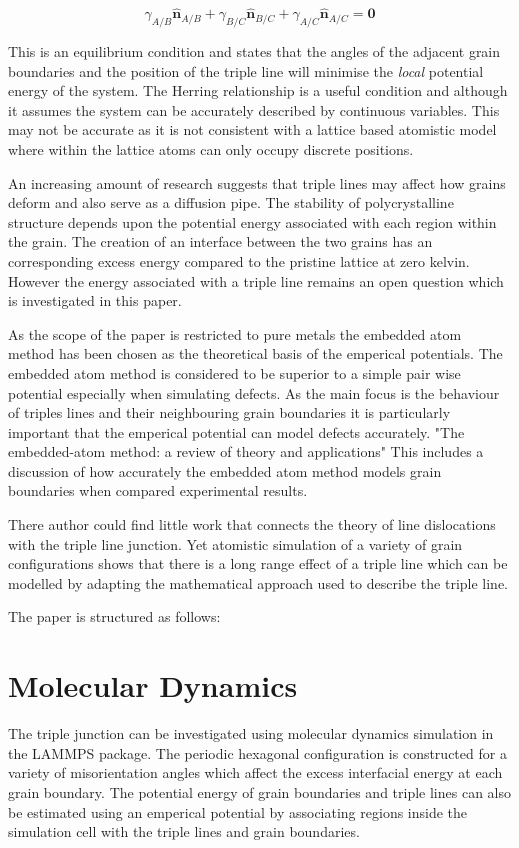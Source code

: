 \documentclass[12pt,a4paper]{book}
\begin{document}
\[\gamma_{A/B}\mathbf{\hat{n}}_{A/B} + \gamma_{B/C}\mathbf{\hat{n}}_{B/C} + \gamma_{A/C}\mathbf{\hat{n}}_{A/C} =\mathbf{0} \]

This is an equilibrium condition and states that the angles of the adjacent grain boundaries and the position of the triple line will minimise the \emph{local} potential energy of the system. The Herring relationship is a useful condition and although it assumes the system can be accurately described by continuous variables. This may not be accurate as it is not consistent with a lattice based atomistic model where within the lattice atoms can only occupy discrete positions.     

An increasing amount of research suggests that triple lines may affect how  grains deform and also serve as a diffusion pipe. The stability of polycrystalline structure depends upon the potential energy associated with each region within the grain. The creation of an interface between the two grains has an corresponding excess energy compared to the pristine lattice at zero kelvin. However the energy associated with a triple line remains an open question which is investigated in this paper.

As the scope of the paper is restricted to pure metals the embedded atom method has been chosen as the theoretical basis of the emperical potentials. The embedded atom method is considered to be superior to a simple pair wise potential especially when simulating defects. As the main focus is the behaviour of triples lines and their neighbouring grain boundaries it is particularly important that the emperical potential can model defects accurately. "The embedded-atom method:
a review of theory and applications" This includes a discussion of how accurately the embedded atom method models grain boundaries when compared  experimental results.

There author could find little work that connects the theory of line dislocations with the triple line junction. Yet atomistic simulation of a variety of grain configurations shows that there is a long range effect of a triple line which can be modelled by adapting the mathematical approach used to describe the triple line.  

The paper is structured as follows:

 


\chapter{Molecular Dynamics}
The triple junction can be investigated using molecular dynamics simulation in the LAMMPS package. The periodic hexagonal configuration is constructed for a variety of misorientation angles which affect the excess interfacial energy at each grain boundary. The potential energy of grain boundaries and triple lines can also be estimated using an emperical potential by associating regions inside the simulation cell with the triple lines and grain boundaries.
\end{document}
